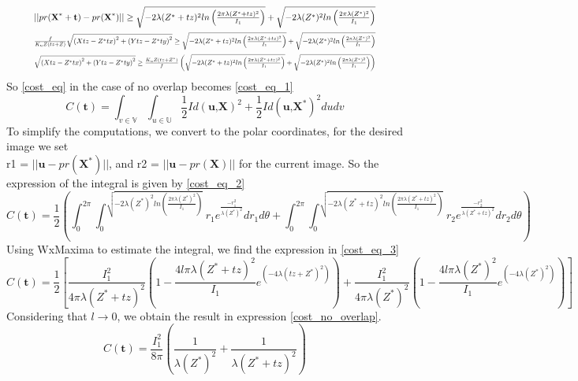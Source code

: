 \begin{equation} \label{no_over_cond}
    \begin{split}
        \resizebox{0.9\hsize}{!}{$||pr(\textbf{X}^{*}+\textbf{t})-pr(\textbf{X}^{*})|| \geq \sqrt{-2\lambda(Z^{*}+tz)^{2} ln\left( \frac{2\pi\lambda(Z^{*}+tz)^{2}}{I_{1}}\right)}+ \sqrt{-2\lambda(Z^{*})^{2} ln\left( \frac{2\pi\lambda(Z^{*})^{2}}{I_{1}}\right)}$}\\
        \resizebox{0.9\hsize}{!}{$\frac{f}{K_{u}Z\left(tz+Z\right)}\sqrt{\left(Xtz-Z^{*}tx\right)^{2}+\left(Ytz-Z^{*}ty\right)^{2}} \geq \sqrt{-2\lambda(Z^{*}+tz)^{2} ln\left( \frac{2\pi\lambda(Z^{*}+tz)^{2}}{I_{1}}\right)}+ \sqrt{-2\lambda(Z^{*})^{2} ln\left( \frac{2\pi\lambda(Z^{*})^{2}}{I_{1}}\right)} $}\\
        \resizebox{0.9\hsize}{!}{$\sqrt{\left(Xtz-Z^{*}tx\right)^{2}+\left(Ytz-Z^{*}ty\right)^{2}} \geq \frac{K_{u}Z\left(tz+Z^{*}\right)}{f} \left(\sqrt{-2\lambda(Z^{*}+tz)^{2} ln\left( \frac{2\pi\lambda(Z^{*}+tz)^{2}}{I_{1}}\right)}+ \sqrt{-2\lambda(Z^{*})^{2} ln\left( \frac{2\pi\lambda(Z^{*})^{2}}{I_{1}}\right)} \right)$}
    \end{split}  
\end{equation}
So \eqref{cost_eq} in the case of no overlap becomes \eqref{cost_eq_1}
\begin{equation}
    C(\textbf{t})= \int_{v\in\mathbb{V}}\int_{u\in\mathbb{U}} \frac{1}{2}Id\left(\textbf{u,X}\right)^{2} + \frac{1}{2}Id\left(\textbf{u,X}^{*}\right)^{2} du dv
\label{cost_eq_1}
\end{equation} 
To simplify the computations, we convert to the polar coordinates, for the desired image we set \\r1 = $||\textbf{u}-pr(\textbf{X}^{*})||$, and r2 = $ ||\textbf{u}-pr(\textbf{X})||$ for the current image. So the expression of the integral is given by \eqref{cost_eq_2} 
\begin{equation}
    C(\textbf{t}) = \frac{1}{2}\left(\int_{0}^{2\pi}\int_{0}^{\sqrt{-2\lambda(Z^{*})^{2} ln\left( \frac{2\pi\lambda(Z^{*})^{2}}{I_{1}}\right)}} r_{1} e^{\frac{-r_{1}^{2}}{\lambda(Z^{*})^{2}}} dr_{1}d\theta + \int_{0}^{2\pi}\int_{0}^{\sqrt{-2\lambda(Z^{*}+tz)^{2} ln\left( \frac{2\pi\lambda(Z^{*}+tz)^{2}}{I_{1}}\right)}} r_{2} e^{\frac{-r_{2}^{2}}{\lambda(Z^{*}+tz)^{2}}} dr_{2}d\theta \right)
    \label{cost_eq_2}
\end{equation}
Using WxMaxima to estimate the integral, we find the expression in \eqref{cost_eq_3}
\begin{equation}
C(\textbf{t}) = \frac{1}{2}\left[\frac{I_{1}^{2}}{4\pi\lambda(Z^{*}+tz)^{2}}\left(1-\frac{4l\pi\lambda(Z^{*}+tz)^{2}}{I_{1}}e^{\left(-4\lambda(tz+Z^{*})^{2}\right)}\right)+\frac{I_{1}^{2}}{4\pi\lambda(Z^{*})^{2}}\left(1-\frac{4l\pi\lambda(Z^{*})^{2}}{I_{1}}e^{\left(-4\lambda(Z^{*})^{2}\right)}\right)\right]
\label{cost_eq_3}
\end{equation}
Considering that $l\rightarrow 0$, we obtain the result in expression \eqref{cost_no_overlap}.
\begin{equation}
C(\textbf{t}) =  \frac{I_{1}^{2}}{8\pi}\left(\frac{1}{\lambda(Z^{*})^{2}}+\frac{1}{\lambda(Z^{*}+tz)^{2}}\right)
\label{cost_no_overlap}
\end{equation}

